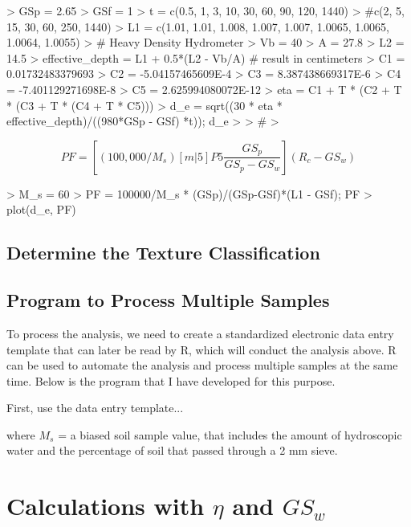 \begin{Schunk}
\begin{Sinput}
> GSp = 2.65
> GSf = 1
> t = c(0.5, 1, 3, 10, 30, 60, 90, 120, 1440)
> #c(2, 5, 15, 30, 60, 250, 1440)
> L1 = c(1.01, 1.01, 1.008, 1.007, 1.007, 1.0065, 1.0065, 1.0064, 1.0055)
> # Heavy Density Hydrometer
> Vb = 40
> A = 27.8
> L2 = 14.5
> effective_depth = L1 + 0.5*(L2 - Vb/A) # result in centimeters
> C1 = 0.01732483379693
> C2 = -5.04157465609E-4
> C3 = 8.387438669317E-6
> C4 = -7.401129271698E-8
> C5 = 2.625994080072E-12
> eta = C1 + T * (C2 + T * (C3 + T *  (C4 + T * C5)))
> d_e = sqrt((30 * eta * effective_depth)/((980*GSp - GSf) *t)); d_e
> 
> #{}
> 
\end{Sinput}
\end{Schunk}

\begin{equation}
PF = [(100,000/M_s)[m|5]P5 \frac{GS_p}{GS_p - GS_w}](R_c - GS_w)
\end{equation}

\begin{Schunk}
\begin{Sinput}
> M_s = 60
> PF = 100000/M_s * (GSp)/(GSp-GSf)*(L1 - GSf); PF
> plot(d_e, PF)
\end{Sinput}
\end{Schunk}

\subsection{Determine the Texture Classification}

\subsection{Program to Process Multiple Samples}

To process the analysis, we need to create a standardized electronic data entry template that can later be read by R, which will conduct the analysis above. R can be used to automate the analysis and process multiple samples at the same time. Below is the program that I have developed for this purpose. 

First, use the data entry template...

 

where $M_s$ = a biased soil sample value, that includes the amount of hydroscopic water and the percentage of soil that passed through a 2 mm sieve. 


\section{Calculations with $\eta$ and $GS_w$}

